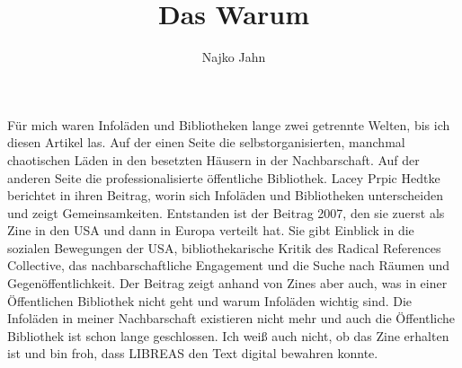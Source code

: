 \documentclass[output=paper]{langsci/langscibook}
\title{Das Warum}
\author{Najko Jahn  \affiliation{SUB Göttingen}}
\begin{document}
\maketitle

\noindent Für mich waren Infoläden und Bibliotheken lange zwei getrennte Welten, bis ich diesen Artikel las. Auf der einen Seite die selbstorganisierten, manchmal chaotischen Läden in den besetzten Häusern in der Nachbarschaft. Auf der anderen Seite die professionalisierte öffentliche Bibliothek. Lacey Prpic Hedtke berichtet in ihren Beitrag, worin sich Infoläden und Bibliotheken unterscheiden und zeigt Gemeinsamkeiten. Entstanden ist der Beitrag 2007, den sie zuerst als Zine in den USA und dann in Europa verteilt hat. Sie gibt Einblick in die sozialen Bewegungen der USA, bibliothekarische Kritik des Radical References Collective, das nachbarschaftliche Engagement und die Suche nach Räumen und Gegenöffentlichkeit. Der Beitrag zeigt anhand von Zines aber auch, was in einer Öffentlichen Bibliothek nicht geht und warum Infoläden wichtig sind. Die Infoläden in meiner Nachbarschaft existieren nicht mehr und auch die Öffentliche Bibliothek ist schon lange geschlossen. Ich weiß auch nicht, ob das Zine erhalten ist und bin froh, dass LIBREAS den Text digital bewahren konnte.
\end{document}
